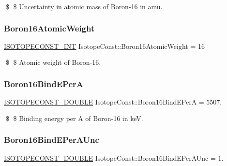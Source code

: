 \$ \$ Uncertainty in atomic mass of Boron-\/16 in amu. \mbox{\label{group___isotope_const-_boron-_b16_ga562f2307a98c0d322f7ba44e22523a9d}} 
\subsubsection{\texorpdfstring{Boron16\+Atomic\+Weight}{Boron16AtomicWeight}}
{\footnotesize\ttfamily \mbox{\hyperlink{group___isotope_const-_macros_ga5f18360b3e99483a35c32d789e62621c}{I\+S\+O\+T\+O\+P\+E\+C\+O\+N\+S\+T\+\_\+\+I\+NT}} Isotope\+Const\+::\+Boron16\+Atomic\+Weight = 16}

\$ \$ Atomic weight of Boron-\/16. \mbox{\label{group___isotope_const-_boron-_b16_gae5d792a500660e8d3654af53016491c7}} 
\subsubsection{\texorpdfstring{Boron16\+Bind\+E\+PerA}{Boron16BindEPerA}}
{\footnotesize\ttfamily \mbox{\hyperlink{group___isotope_const-_macros_ga8f45a7272ce02c0b4c65c44636ed719a}{I\+S\+O\+T\+O\+P\+E\+C\+O\+N\+S\+T\+\_\+\+D\+O\+U\+B\+LE}} Isotope\+Const\+::\+Boron16\+Bind\+E\+PerA = 5507.}

\$ \$ Binding energy per A of Boron-\/16 in keV. \mbox{\label{group___isotope_const-_boron-_b16_ga1195aca9a018129753b78f4921deb437}} 
\subsubsection{\texorpdfstring{Boron16\+Bind\+E\+Per\+A\+Unc}{Boron16BindEPerAUnc}}
{\footnotesize\ttfamily \mbox{\hyperlink{group___isotope_const-_macros_ga8f45a7272ce02c0b4c65c44636ed719a}{I\+S\+O\+T\+O\+P\+E\+C\+O\+N\+S\+T\+\_\+\+D\+O\+U\+B\+LE}} Isotope\+Const\+::\+Boron16\+Bind\+E\+Per\+A\+Unc = 1.}

